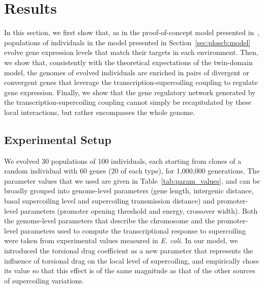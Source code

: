 \section{Results}

In this section, we first show that, as in the proof-of-concept model presented in~\citep{grohens2021}, populations of individuals in the model presented in Section~\ref{sec:ploscb:model} evolve gene expression levels that match their targets in each environment.
Then, we show that, consistently with the theoretical expectations of the twin-domain model, the genomes of evolved individuals are enriched in pairs of divergent or convergent genes that leverage the transcription-supercoiling coupling to regulate gene expression.
Finally, we show that the gene regulatory network generated by the transcription-supercoiling coupling cannot simply be recapitulated by these local interactions, but rather encompasses the whole genome.

\subsection{Experimental Setup}

We evolved 30 populations of 100 individuals, each starting from clones of a random individual with 60 genes (20 of each type), for 1,000,000 generations.
The parameter values that we used are given in Table~\ref{tab:param_values}, and can be broadly grouped into genome-level parameters (gene length, intergenic distance, basal supercoiling level and supercoiling transmission distance) and promoter-level parameters (promoter opening threshold and energy, crossover width).
Both the genome-level parameters that describe the chromosome and the promoter-level parameters used to compute the transcriptional response to supercoiling were taken from experimental values measured in \emph{E. coli}.
In our model, we introduced the torsional drag coefficient as a new parameter that represents the influence of torsional drag on the local level of supercoiling, and empirically chose its value so that this effect is of the same magnitude as that of the other sources of supercoiling variations.

